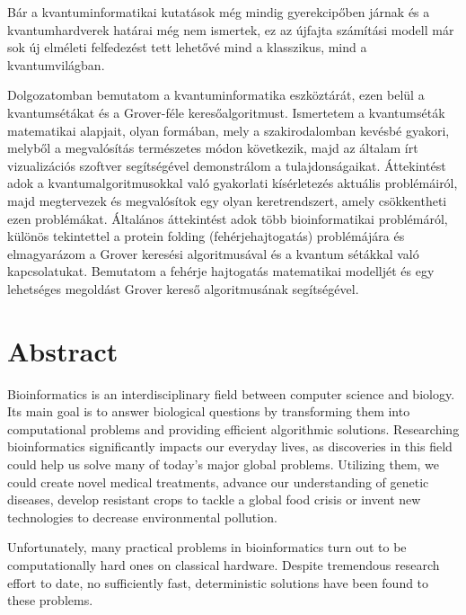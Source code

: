 Bár a kvantuminformatikai kutatások még mindig gyerekcipőben járnak és a kvantumhardverek határai még nem ismertek, ez az újfajta számítási modell már sok új elméleti felfedezést tett lehetővé mind a klasszikus, mind a kvantumvilágban.

Dolgozatomban bemutatom a kvantuminformatika eszköztárát, ezen belül a kvantumsétákat és a Grover-féle keresőalgoritmust. Ismertetem a kvantumséták matematikai alapjait, olyan formában, mely a szakirodalomban kevésbé gyakori, melyből a megvalósítás természetes módon következik, majd az általam írt vizualizációs szoftver segítségével demonstrálom a tulajdonságaikat. Áttekintést adok a kvantumalgoritmusokkal való gyakorlati kísérletezés aktuális problémáiról, majd megtervezek és megvalósítok egy olyan keretrendszert, amely csökkentheti ezen problémákat. Általános áttekintést adok több bioinformatikai problémáról, különös tekintettel a protein folding (fehérjehajtogatás) problémájára és elmagyarázom a Grover keresési algoritmusával és a kvantum sétákkal való kapcsolatukat. Bemutatom a fehérje hajtogatás matematikai modelljét és egy lehetséges megoldást Grover kereső algoritmusának segítségével.

\vfill
\selectenglish

\chapter*{Abstract}

Bioinformatics is an interdisciplinary field between computer science and biology. Its main goal is to answer biological questions by transforming them into computational problems and providing efficient algorithmic solutions. Researching bioinformatics significantly impacts our everyday lives, as discoveries in this field could help us solve many of today's major global problems. Utilizing them, we could create novel medical treatments, advance our understanding of genetic diseases, develop resistant crops to tackle a global food crisis or invent new technologies to decrease environmental pollution.

Unfortunately, many practical problems in bioinformatics turn out to be computationally hard ones on classical hardware. Despite tremendous research effort to date, no sufficiently fast, deterministic solutions have been found to these problems.

